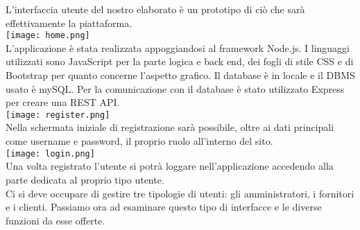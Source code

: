 L'interfaccia utente del nostro elaborato è un prototipo di ciò che sarà effettivamente la piattaforma.\\
\texttt{[image: home.png]}\\
L'applicazione è stata realizzata appoggiandosi al framework Node.js. 
I linguaggi utilizzati sono JavaScript per la parte logica e back end, dei fogli di stile CSS e di Bootstrap per quanto concerne l'aspetto grafico. 
Il database è in locale e il DBMS usato è mySQL.
Per la comunicazione con il database è stato utilizzato Express per creare una REST API.\\
\texttt{[image: register.png]}\\
Nella schermata iniziale di registrazione sarà possibile, oltre ai dati principali come username e password, il proprio ruolo all'interno del sito.\\
\texttt{[image: login.png]}\\
Una volta registrato l'utente si potrà loggare nell'applicazione accedendo alla parte dedicata al proprio tipo utente.\\
\vfill
Ci si deve occupare di gestire tre tipologie di utenti: gli amministratori, i fornitori e i clienti.
Passiamo ora ad esaminare questo tipo di interfacce e le diverse funzioni da esse offerte.